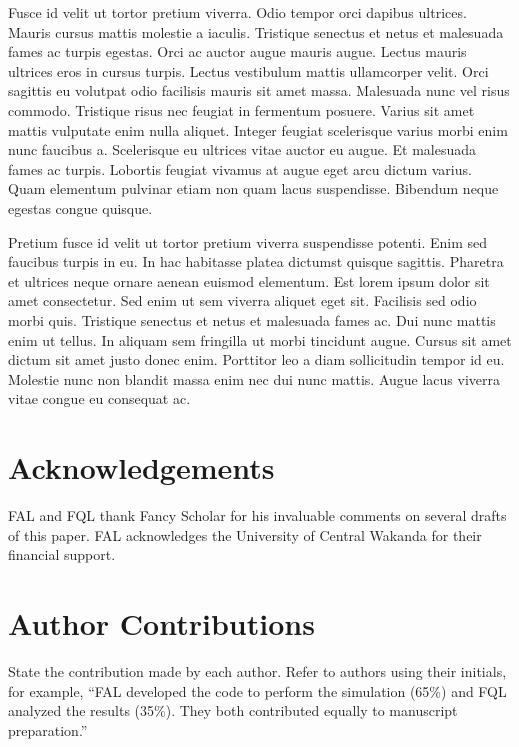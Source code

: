 \documentclass{article}
\begin{document}
Fusce id velit ut tortor pretium viverra. Odio tempor orci dapibus ultrices. Mauris cursus mattis molestie a iaculis. Tristique senectus et netus et malesuada fames ac turpis egestas. Orci ac auctor augue mauris augue. Lectus mauris ultrices eros in cursus turpis. Lectus vestibulum mattis ullamcorper velit. Orci sagittis eu volutpat odio facilisis mauris sit amet massa. Malesuada nunc vel risus commodo. Tristique risus nec feugiat in fermentum posuere. Varius sit amet mattis vulputate enim nulla aliquet. Integer feugiat scelerisque varius morbi enim nunc faucibus a. Scelerisque eu ultrices vitae auctor eu augue. Et malesuada fames ac turpis. Lobortis feugiat vivamus at augue eget arcu dictum varius. Quam elementum pulvinar etiam non quam lacus suspendisse. Bibendum neque egestas congue quisque.

Pretium fusce id velit ut tortor pretium viverra suspendisse potenti. Enim sed faucibus turpis in eu. In hac habitasse platea dictumst quisque sagittis. Pharetra et ultrices neque ornare aenean euismod elementum. Est lorem ipsum dolor sit amet consectetur. Sed enim ut sem viverra aliquet eget sit. Facilisis sed odio morbi quis. Tristique senectus et netus et malesuada fames ac. Dui nunc mattis enim ut tellus. In aliquam sem fringilla ut morbi tincidunt augue. Cursus sit amet dictum sit amet justo donec enim. Porttitor leo a diam sollicitudin tempor id eu. Molestie nunc non blandit massa enim nec dui nunc mattis. Augue lacus viverra vitae congue eu consequat ac.


\ledgernotes

\section*{Acknowledgements} 

FAL and FQL thank Fancy Scholar for his 
invaluable comments on several drafts of this paper. 
FAL acknowledges the University of Central Wakanda for their financial support.

\section*{Author Contributions}

State the contribution made by each author.  Refer to authors using their initials, for example, ``FAL developed the code to perform the simulation (65\%) and FQL analyzed the results (35\%).  They both contributed equally to manuscript preparation.''
\end{document}
